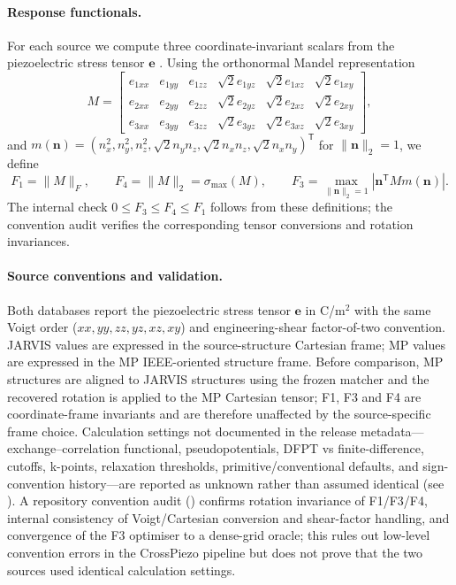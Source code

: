 \documentclass[11pt]{article}
\newcommand{\E}{\mathbf{e}}
\begin{document}
\paragraph{Response functionals.}
For each source we compute three coordinate-invariant scalars from the piezoelectric stress tensor $\E$ \cite{nye1957}.
Using the orthonormal Mandel representation
\[
M = \begin{bmatrix}
e_{1xx} & e_{1yy} & e_{1zz} & \sqrt{2}e_{1yz} & \sqrt{2}e_{1xz} & \sqrt{2}e_{1xy}\\
e_{2xx} & e_{2yy} & e_{2zz} & \sqrt{2}e_{2yz} & \sqrt{2}e_{2xz} & \sqrt{2}e_{2xy}\\
e_{3xx} & e_{3yy} & e_{3zz} & \sqrt{2}e_{3yz} & \sqrt{2}e_{3xz} & \sqrt{2}e_{3xy}
\end{bmatrix},
\]
and $m(\bm n)=(n_x^2,n_y^2,n_z^2,\sqrt{2}n_yn_z,\sqrt{2}n_xn_z,\sqrt{2}n_xn_y)^\mathsf{T}$ for $\|\bm n\|_2=1$, we define
\[
F_1=\|M\|_F,\qquad F_4=\|M\|_2=\sigma_{\max}(M),\qquad
F_3=\max_{\|\bm n\|_2=1}|\bm n^\mathsf{T}M m(\bm n)|.
\]
The internal check $0\leq F_3\leq F_4\leq F_1$ follows from these definitions; the convention audit verifies the corresponding tensor conversions and rotation invariances.

\paragraph{Source conventions and validation.}
Both databases report the piezoelectric stress tensor $\E$ in C/m$^2$ with the same Voigt order ($xx,yy,zz,yz,xz,xy$) and engineering-shear factor-of-two convention.
JARVIS values are expressed in the source-structure Cartesian frame; MP values are expressed in the MP IEEE-oriented structure frame.
Before comparison, MP structures are aligned to JARVIS structures using the frozen matcher and the recovered rotation is applied to the MP Cartesian tensor; F1, F3 and F4 are coordinate-frame invariants and are therefore unaffected by the source-specific frame choice.
Calculation settings not documented in the release metadata---exchange--correlation functional, pseudopotentials, DFPT vs finite-difference, cutoffs, k-points, relaxation thresholds, primitive/conventional defaults, and sign-convention history---are reported as unknown rather than assumed identical (see ).
A repository convention audit () confirms rotation invariance of F1/F3/F4, internal consistency of Voigt/Cartesian conversion and shear-factor handling, and convergence of the F3 optimiser to a dense-grid oracle; this rules out low-level convention errors in the CrossPiezo pipeline but does not prove that the two sources used identical calculation settings.
\end{document}
